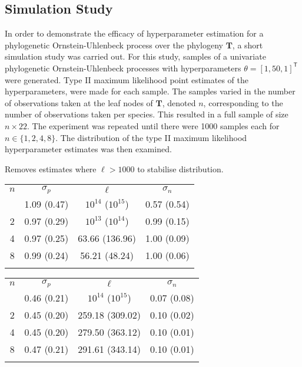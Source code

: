 \documentclass[wsdraft]{ws-rv9x6} %
\begin{document}
\subsection{Simulation Study}

In order to demonstrate the efficacy of hyperparameter estimation for a phylogenetic Ornstein-Uhlenbeck process over the phylogeny \(\mathbf{T}\), a short simulation study was carried out. For this study, samples of a univariate phylogenetic Ornstein-Uhlenbeck processes with hyperparameters \(\theta= [1,50,1]^{\mathsf{T}}\) were generated. Type II maximum likelihood point estimates of the hyperparameters, were made for each sample. The samples varied in the number of observations taken at the leaf nodes of \(\mathbf{T}\), denoted \(n\), corresponding to the number of observations taken per species. This resulted in a full sample of size \(n \times 22\). The experiment was repeated until there were 1000 samples each for \(n \in \{1,2,4,8\}\). The distribution of the type II maximum likelihood hyperparameter estimates was then examined.

Removes estimates where \(\ell > 1000\) to stabilise distribution.

\begin{table}[ht]
	{
		\begin{tabular}{@{}cccc@{}} \toprule
			\(n\)  & \(\sigma_p \) & \(\ell\) & \(\sigma_n\) \\
			\colrule
			1 & 1.09 (0.47) & \(10^{14}\) (\(10^{15}\)) & 0.57 (0.54) \\
			2 & 0.97 (0.29) & \(10^{13}\) (\(10^{14}\)) & 0.99 (0.15) \\
			4 & 0.97 (0.25) & 63.66 (136.96) & 1.00 (0.09) \\
			8 & 0.99 (0.24) & 56.21 (48.24) & 1.00 (0.06) \\			
			\botrule
		\end{tabular}
	}
	\label{tab::simulation_option2}
\end{table}

\begin{table}[ht]
	{
		\begin{tabular}{@{}cccc@{}} \toprule
			\(n\)  & \(\sigma_p \) & \(\ell\) & \(\sigma_n\) \\
			\colrule
			1 & 0.46 (0.21) & \(10^{14}\) (\(10^{15}\)) & 0.07 (0.08) \\
			2 &  0.45 (0.20) & 259.18 (309.02) & 0.10 (0.02) \\
			4 & 0.45 (0.20) & 279.50 (363.12) & 0.10 (0.01) \\
			8 & 0.47 (0.21) & 291.61 (343.14) & 0.10 (0.01) \\			
			\botrule
		\end{tabular}
	}
	\label{tab::simulation_option3}
\end{table}
\end{document}
